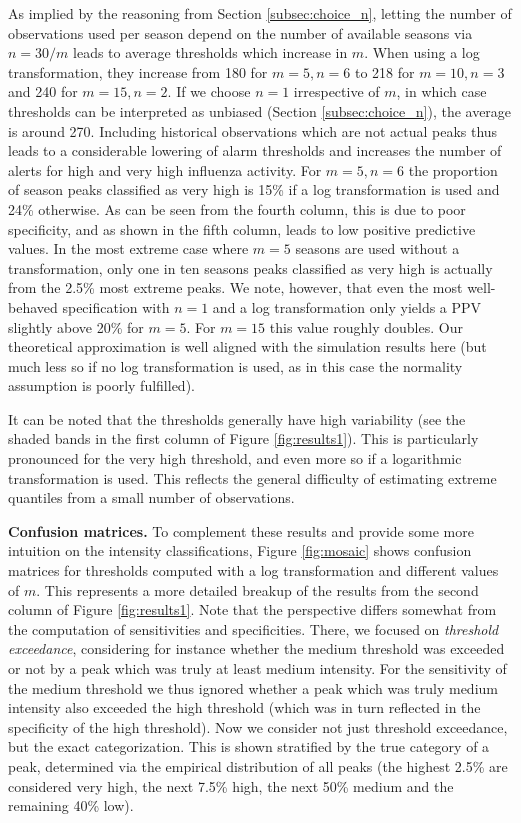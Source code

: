 \documentclass{article}
\begin{document}
As implied by the reasoning from Section \ref{subsec:choice_n}, letting the number of observations used per season depend on the number of available seasons via $n = 30/m$ leads to average thresholds which increase in $m$. When using a log transformation, they increase from 180 for $m = 5, n = 6$ to 218 for $m = 10, n = 3$ and 240 for $m = 15, n = 2$. If we choose $n = 1$ irrespective of $m$, in which case thresholds can be interpreted as unbiased (Section \ref{subsec:choice_n}), the average is around 270. Including historical observations which are not actual peaks thus leads to a considerable lowering of alarm thresholds and increases the number of alerts for high and very high influenza activity. For $m = 5, n = 6$ the proportion of season peaks classified as very high is 15\% if a log transformation is used and 24\% otherwise. As can be seen from the fourth column, this is due to poor specificity, and as shown in the fifth column, leads to low positive predictive values. In the most extreme case where $m = 5$ seasons are used without a transformation, only one in ten seasons peaks classified as very high is actually from the 2.5\% most extreme peaks. We note, however, that even the most well-behaved specification with $n = 1$ and a log transformation only yields a PPV slightly above 20\% for $m = 5$. For $m = 15$ this value roughly doubles. Our theoretical approximation is well aligned with the simulation results here (but much less so if no log transformation is used, as in this case the normality assumption is poorly fulfilled).


It can be noted that the thresholds generally have high variability (see the shaded bands in the first column of Figure \ref{fig:results1}). This is particularly pronounced for the very high threshold, and even more so if a logarithmic transformation is used. This reflects the general difficulty of estimating extreme quantiles from a small number of observations.

\textbf{Confusion matrices.} To complement these results and provide some more intuition on the intensity classifications, Figure \ref{fig:mosaic} shows confusion matrices for thresholds computed with a log transformation and different values of $m$. This represents a more detailed breakup of the results from the second column of Figure \ref{fig:results1}. Note that the perspective differs somewhat from the computation of sensitivities and specificities. There, we focused on \textit{threshold exceedance}, considering for instance whether the medium threshold was exceeded or not by a peak which was truly at least medium intensity. For the sensitivity of the medium threshold we thus ignored whether a peak which was truly medium intensity also exceeded the high threshold (which was in turn reflected in the specificity of the high threshold). Now we consider not just threshold exceedance, but the exact categorization. This is shown stratified by the true category of a peak, determined via the empirical distribution of all peaks (the highest 2.5\% are considered very high, the next 7.5\% high, the next 50\% medium and the remaining 40\% low).
\end{document}
